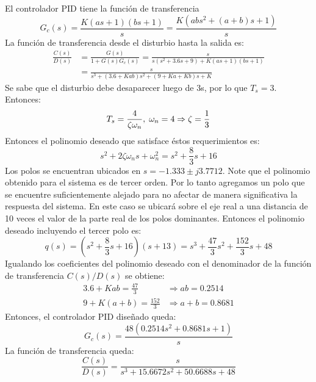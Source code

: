 \documentclass[11pt, spanish]{article}
\begin{document}
\begin{description}
			El controlador PID tiene la función de transferencia
			\begin{equation*}
				G_c(s) = \frac{K(as+1)(bs+1)}{s} = \frac{K(abs^2 + (a+b)s + 1)}{s}
			\end{equation*}
			La función de transferencia desde el disturbio hasta la salida es:
			\begin{align*}
				\frac{C(s)}{D(s)} &= \frac{G(s)}{1+G(s)G_c(s)} = \frac{s}{s(s^2+3.6s+9)+K(as+1)(bs+1)}\\
				&= \frac{s}{s^3 + (3.6+Kab)s^2 +(9+Ka+Kb)s + K}
			\end{align*}
			Se sabe que el disturbio debe desaparecer luego de 3s, por lo que $T_s = 3$. Entonces:
			\begin{equation*}
				T_s = \frac{4}{\zeta \omega_n},\hspace*{1mm} \omega_n = 4 \Rightarrow \zeta = \frac{1}{3}
			\end{equation*}
			Entonces el polinomio deseado que satisface éstos requerimientos es:
			\begin{equation*}
				s^2 + 2\zeta \omega_n s + \omega_n^2 = s^2 + \frac{8}{3}s + 16
			\end{equation*}
			Los polos se encuentran ubicados en $s = -1.333 \pm j3.7712$.
			Note que el polinomio obtenido para el sistema es de tercer orden. Por lo tanto agregamos un polo que se encuentre suficientemente alejado para no afectar de manera significativa la respuesta del sistema. En este caso se ubicará sobre el eje real a una distancia de 10 veces el valor de la parte real de los polos dominantes. Entonces el polinomio deseado incluyendo el tercer polo es:
			\begin{equation*}
				q(s) = (s^2 + \frac{8}{3}s + 16)(s+13) = s^3 + \frac{47}{3}s^2 + \frac{152}{3}s + 48
			\end{equation*}
			Igualando los coeficientes del polinomio deseado con el denominador de la función de transferencia $C(s)/D(s)$ se obtiene:
			\begin{align*}
				3.6 + Kab = \frac{47}{3} &\Rightarrow ab = 0.2514\\
				9 + K(a+b) = \frac{152}{3} &\Rightarrow a+b = 0.8681
			\end{align*}
			Entonces, el controlador PID diseñado queda:
			\begin{equation*}
				G_c(s) = \frac{48(0.2514s^2 + 0.8681s + 1)}{s}
			\end{equation*}
			La función de transferencia queda:
			\begin{equation*}
				\frac{C(s)}{D(s)} = \frac{s}{s^3+15.6672s^2+50.6688s+48}

\end{equation*}
\end{description}
\end{document}
